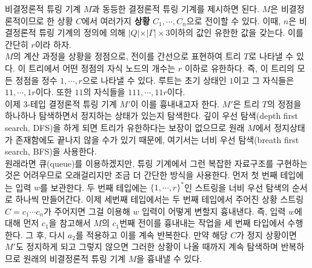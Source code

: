 \documentclass[b5paper, 10pt]{book}
\theoremstyle{definition}
\newenvironment{pf*}{\pushQED{\qed}\pf}{\popQED\endpf}
\begin{document}
\begin{pf*}
    비결정론적 튜링 기계 $M$과 동등한 결정론적 튜링 기계를 제시하면 된다. 
    $M$은 비결정론적이므로 한 상황 $C$에서 여러가지 \textbf{상황} $C_1, \cdots, C_n$으로 
    전이할 수 있다. 이때, $n$은 비결정론적 튜링 기계의 정의에 의해 $\vert Q \vert
    \times \vert \Gamma \vert \times 3$이하의 값인 유한한 값을 갖는다. 이를 간단히 $r$이라 하자. \\ 
    $M$의 계산 과정을 상황을 정점으로, 전이를 간선으로 표현하여 트리 $T$로 나타낼 수 있다.
    이 트리에서 어떤 정점의 자식 노드의 개수는 $r$ 이하로 유한하다. 즉, 이 트리의 모든 정점을
    정수 $1, \cdots, r$으로 나타낼 수 있다. 루트는 초기 상태인 $1$이고 그 자식들은
    $11, \cdots, 1r$이다. 또한 $11$의 자식들을 $111, \cdots, 11r$이다. \\
    이제 3-테입 결정론적 튜링 기계 $M'$이 이를 흉내내고자 한다. $M'$은 트리 $T$의 정점을
    하나하나 탐색하면서 정지하는 상태가 있는지 탐색한다. 깊이 우선 탐색(depth first search, DFS)을
    하게 되면 트리가 유한하다는 보장이 없으므로 원래 $M$에서 정지상태가 존재함에도 
    끝나지 않을 수가 있기 때문에, 여기서는 너비 우선 탐색(breath first search, BFS)을
    사용한다. \\ 
    원래라면 큐(queue)를 이용하겠지만, 튜링 기계에서 그런 복잡한 자료구조를 구현하는 것은
    어려우므로 오래걸리지만 조금 더 간단한 방식을 사용한다. 먼저 첫 번째 테입에는 입력
    $w$를 보관한다. 두 번째 테입에는 $\{1, \cdots, r\}^*$인 스트링을 너비 우선 탐색의
    순서로 하나씩 만들어간다. 이제 세번째 테입에서는 두 번째 테입에서 주어진 상황 스트링 
    $C = c_1 \cdots c_n $가 주어지면 그걸 이용해 $w$ 입력이 어떻게 변할지 흉내낸다. 
    즉, 입력 $w$에 대해 먼저 $c_1$을 참고해서 $M$의 $c_1$번째 전이를 흉내내는 작업을 
    세 번째 타입에서 수행한다. 그 후, 다시 $a_2$를 적용하고 이를 계속 반복한다. 만약
    해당 $C$가 정지 상황이면 $M'$도 정지하게 되고 그렇지 않으면 그러한 상황이 나올 때까지
    계속 탐색하며 반복하므로 원래의 비결정론적 튜링 기계 $M$을 흉내낼 수 있다.
\end{pf*}
\end{document}
